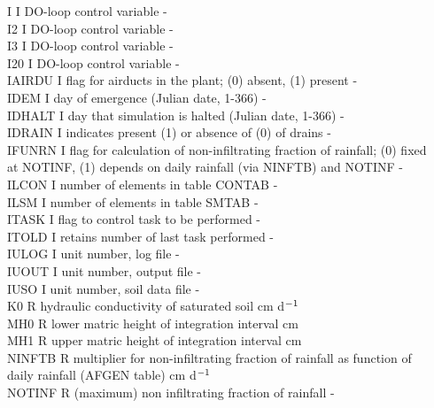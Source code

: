 \begin{tabbing}
I\> \> I\> DO-loop control variable\> \> \> \> \> \> \> -\\
I2\> \> I\> DO-loop control variable\> \> \> \> \> \> \> - \\
I3\> \> I\> DO-loop control variable\> \> \> \> \> \> \> - \\
I20\> \> I\> DO-loop control variable\> \> \> \> \> \> \> - \\
IAIRDU\> \> I\> flag for airducts in the plant; (0) absent, (1) present\> \> \> \> \> \> \> -\\
IDEM\> \> I\> day of emergence (Julian date, 1-366)\> \> \> \> \> \> \> -\\
IDHALT\> \> I\> day that simulation is halted (Julian date, 1-366)\> \> \> \> \> \> \> -\\
IDRAIN\> \> I\> indicates present (1) or absence of (0) of drains\> \> \> \> \> \> \> -\\
IFUNRN\> \> I\> flag for calculation of non-infiltrating fraction of rainfall; (0) fixed\\
 \>\> \> at NOTINF, (1) depends on daily rainfall (via NINFTB) and NOTINF\> \> \> \> \> \> \> -\\
ILCON\> \> I\> number of elements in table CONTAB\> \> \> \> \> \> \> -\\
ILSM\> \> I\> number of elements in table SMTAB\> \> \> \> \> \> \> -\\
ITASK\> \> I\> flag to control task to be performed\> \> \> \> \> \> \> -\\
ITOLD\> \> I\> retains number of last task performed\> \> \> \> \> \> \> -\\
IULOG\> \> I\> unit number, log file\> \> \> \> \> \> \> -\\
IUOUT\> \> I\> unit number, output file\> \> \> \> \> \> \> -\\
IUSO\> \> I\> unit number, soil data file \> \> \> \> \> \> \> -\\
K0\> \> R\> hydraulic conductivity of saturated soil\> \> \> \> \> \> \> cm d$^{{\rm -1}}$\\
MH0\> \> R\> lower matric height of integration interval\> \> \> \> \> \> \> cm\\
MH1\> \> R\> upper matric height of integration interval\> \> \> \> \> \> \> cm\\
NINFTB\> \> R\> multiplier for non-infiltrating fraction of rainfall as function of\\
\>\> \> daily rainfall (AFGEN table)\> \> \> \> \> \> \> cm d$^{{\rm -1}}$\\
NOTINF\> \> R\> (maximum) non infiltrating fraction of rainfall\> \> \> \> \> \> \> -\\

\end{tabbing}
